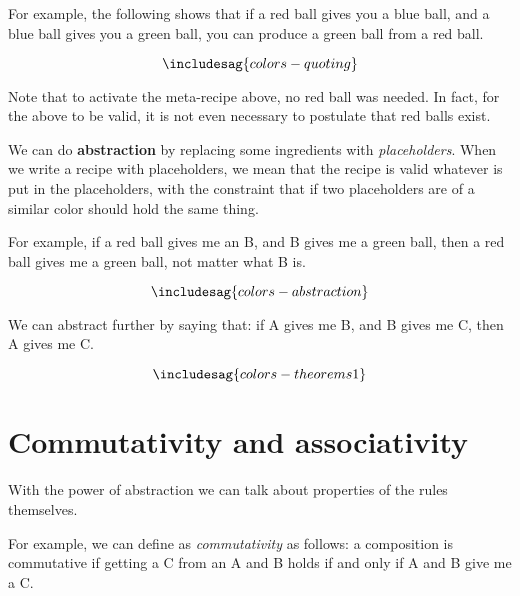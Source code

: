 For example, the following shows that if a red ball gives you a blue ball, and a blue ball gives you a green ball, you can produce a green ball from a red ball.


\begin{equation*}
\includesag{colors-quoting}
\end{equation*}


Note that to activate the meta-recipe above, no red ball was needed.
In fact, for the above to be valid, it is not even necessary to postulate that red balls exist.

We can do \textbf{abstraction} by replacing some ingredients with \emph{placeholders}.
When we write a recipe with placeholders, we mean that the recipe is valid whatever is put in the placeholders, with the constraint that if two placeholders are of a similar color should hold the same thing.

For example, if a red ball gives me an B, and B gives me a green ball, then a red ball gives me a green ball, not matter what B is.

\begin{equation*}
  \includesag{colors-abstraction}
\end{equation*}


We can abstract further by saying that: if A gives me B, and B gives me C, then A gives me C.

\begin{equation*}
  \includesag{colors-theorems1}
\end{equation*}



\section{Commutativity and associativity}

With the power of abstraction we can talk about properties of the rules themselves.

For example, we can define as \emph{commutativity} as follows: a composition is commutative if getting a C from an A and B holds if and only if A and B give me a C.

\begin{center}
\end{center}


